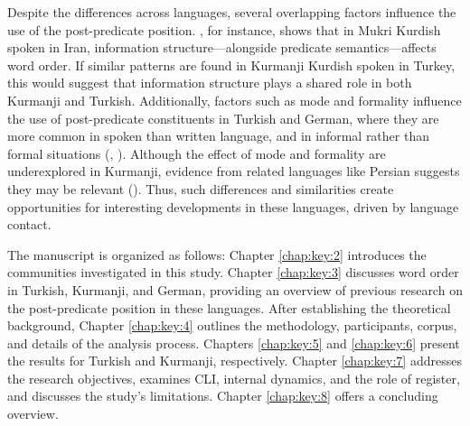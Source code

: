 Despite the differences across languages, several overlapping factors influence the use of the post-predicate position. \citet{Asadpour2021}, for instance, shows that in Mukri Kurdish spoken in Iran, information structure—alongside predicate semantics—affects word order. If similar patterns are found in Kurmanji Kurdish spoken in Turkey, this would suggest that information structure plays a shared role in both Kurmanji and Turkish. Additionally, factors such as mode and formality influence the use of post-predicate constituents in Turkish and German, where they are more common in spoken than written language, and in informal rather than formal situations (\citealt{Schroeder1995, Schroeder2002}, \citealt{Tsehaye2023}). Although the effect of mode and formality are underexplored in Kurmanji, evidence from related languages like Persian suggests they may be relevant (\citealt{Frommer1981, Haig_post-predicate_EtAl2024-1}). Thus, such differences and similarities create opportunities for interesting developments in these languages, driven by language contact.

The manuscript is organized as follows: Chapter \ref{chap:key:2} introduces the communities investigated in this study. Chapter \ref{chap:key:3} discusses word order in Turkish, Kurmanji, and German, providing an overview of previous research on the post-predicate position in these languages. After establishing the theoretical background, Chapter \ref{chap:key:4} outlines the methodology, participants, corpus, and details of the analysis process. Chapters \ref{chap:key:5} and \ref{chap:key:6} present the results for Turkish and Kurmanji, respectively. Chapter \ref{chap:key:7} addresses the research objectives, examines CLI, internal dynamics, and the role of register, and discusses the study’s limitations. Chapter \ref{chap:key:8} offers a concluding overview.

